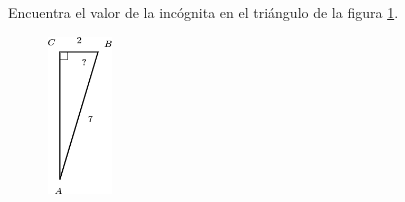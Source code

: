 Encuentra el valor de la incógnita en el triángulo de la figura \ref{fig:angle_functrig_12}.
\begin{figure}[H]
    \begin{center}
        \includegraphics[width=0.15\textwidth]{../images/angle_functrig_12.png}
    \end{center}
    \caption{}
    \label{fig:angle_functrig_12}
\end{figure}